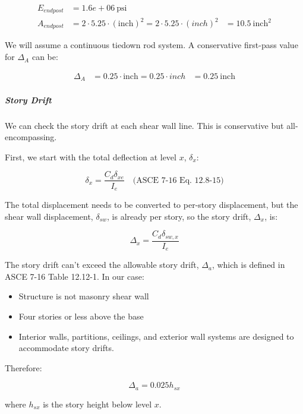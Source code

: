 \documentclass[11pt]{article}
\providecommand{\tightlist}{%
      \setlength{\itemsep}{0pt}\setlength{\parskip}{0pt}}
\begin{document}
    \begin{equation*}
\begin{aligned}
E_{endpost} &= 1.6e+06\ \mathrm{psi} \; 
\\
A_{endpost} &= 2 \cdot 5.25 \cdot \left( \mathrm{inch} \right) ^{ 2 }  = 2 \cdot 5.25 \cdot \left( inch \right) ^{ 2 } &= 10.5\ \mathrm{inch}^{2}  
\end{aligned}
\end{equation*}

    
    We will assume a continuous tiedown rod system. A conservative
first-pass value for \(\Delta_A\) can be:

    \begin{equation*}
\begin{aligned}
\Delta_{A} &= 0.25 \cdot \mathrm{inch}  = 0.25 \cdot inch &= 0.25\ \mathrm{inch}  
\end{aligned}
\end{equation*}

    
    \subparagraph{Story Drift}\label{story-drift}

We can check the story drift at each shear wall line. This is
conservative but all-encompassing.

First, we start with the total deflection at level \(x\), \(\delta_x\):

\[
\delta_x = \frac{C_d \delta_{xe}}{I_e}\quad \text{(ASCE 7-16 Eq. 12.8-15)}
\]

The total displacement needs to be converted to per-story displacement,
but the shear wall displacement, \(\delta_{sw}\), is already per story,
so the story drift, \(\Delta_x\), is:

\[
\Delta_x = \frac{C_d \delta_{sw,x}}{I_e}
\]

The story drift can't exceed the allowable story drift, \(\Delta_a\),
which is defined in ASCE 7-16 Table 12.12-1. In our case:

\begin{itemize}
\tightlist
\item
  Structure is not masonry shear wall
\item
  Four stories or less above the base
\item
  Interior walls, partitions, ceilings, and exterior wall systems are
  designed to accommodate story drifts.
\end{itemize}

Therefore:

\[
\Delta_a = 0.025 h_{sx}
\]

where \(h_{sx}\) is the story height below level \(x\).
\end{document}
